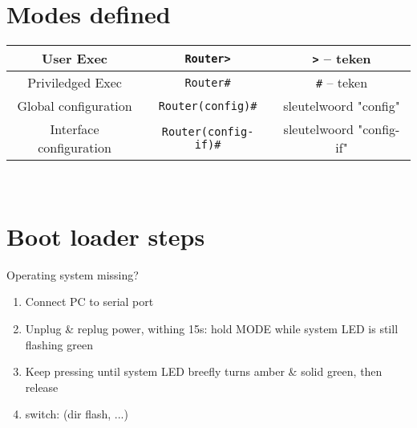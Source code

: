 \documentclass[10pt, a4paper]{article}
\begin{document}
	\section{Modes defined}
	\begin{tabular}{|c|c|c|}
		\hline \rule[-1ex]{0pt}{4ex} User Exec & \texttt{Router>} & \texttt{>} -- teken \\
		\hline \rule[-1ex]{0pt}{4ex} Priviledged Exec & \texttt{Router\#} & \texttt{\#} -- teken \\
		\hline \rule[-1ex]{0pt}{4ex} Global configuration & \texttt{Router(config)\#} & sleutelwoord "config" \\
		\hline \rule[-1ex]{0pt}{4ex} Interface configuration & \texttt{Router(config-if)\#} & sleutelwoord "config-if" \\
		\hline
	\end{tabular} \\

	\section{Boot loader steps}
	Operating system missing?
	\begin{enumerate}
		\item Connect PC to serial port
		\item Unplug \& replug power, withing 15s: hold MODE while system LED is still flashing green
		\item Keep pressing until system LED breefly turns amber \& solid green, then release
		\item switch: (dir flash, ...)
	\end{enumerate}
\end{document}
